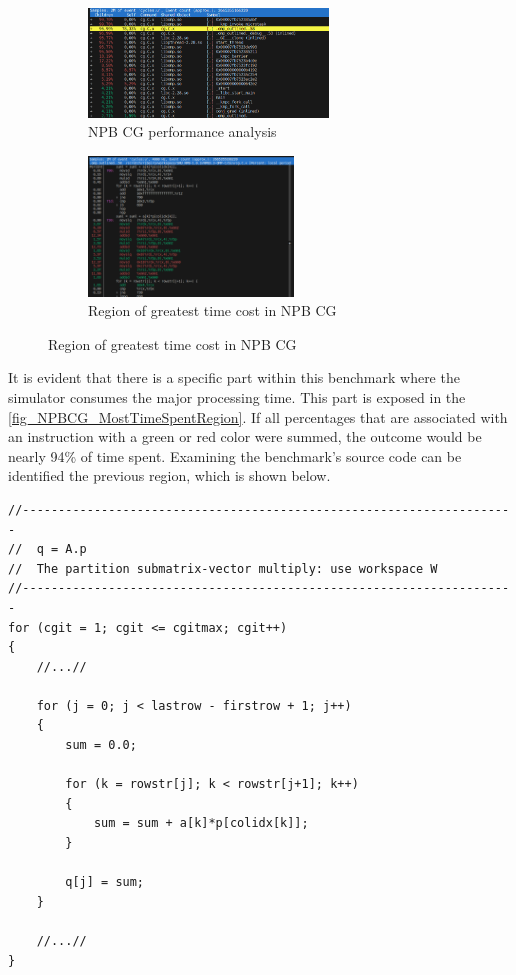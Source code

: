\begin{figure}[H]
    \begin{subfigure}{\textwidth}
        \centering
        \includegraphics[width=0.7\textwidth]{Images/NPBCG_CycleAnalysis.png}
        \caption{ NPB CG performance analysis}
        \label{fig_NPBCG_CycleAnalysis}
    \end{subfigure}
    \begin{subfigure}{\textwidth}
        \centering
        \includegraphics[width=0.6\textwidth]{Images/NPBCG_MostTimeSpentRegion.png}
        \caption{ Region of greatest time cost in NPB CG}
        \label{fig_NPBCG_MostTimeSpentRegion}
    \end{subfigure}
\end{figure}

It is evident that there is a specific part within this benchmark where the simulator consumes the major processing time. This part is 
exposed in the \autoref{fig_NPBCG_MostTimeSpentRegion}. If all percentages that are associated with an instruction with a green or red color 
were summed, the outcome would be nearly 94\% of time spent. Examining the benchmark's source code can be identified the previous region, which is 
shown below. 


\begin{lstlisting}[style=customC, caption={Source code of NPB CG snippet}, label=CodeNpbCgSnippet]
//---------------------------------------------------------------------
//  q = A.p
//  The partition submatrix-vector multiply: use workspace W
//---------------------------------------------------------------------
for (cgit = 1; cgit <= cgitmax; cgit++) 
{
    //...//

    for (j = 0; j < lastrow - firstrow + 1; j++) 
    {
        sum = 0.0;

        for (k = rowstr[j]; k < rowstr[j+1]; k++) 
        {
            sum = sum + a[k]*p[colidx[k]];
        }

        q[j] = sum;
    }

    //...//
}
\end{lstlisting}

